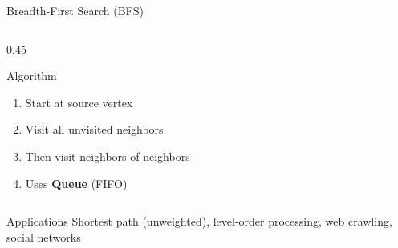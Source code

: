 \documentclass[aspectratio=169,xcolor=dvipsnames]{beamer}
\begin{document}
\begin{frame}{Breadth-First Search (BFS)}
  \begin{columns}
    \begin{column}{0.45\textwidth}
      \begin{block}{Algorithm}
        \begin{enumerate}
          \item Start at source vertex
          \item Visit all unvisited neighbors
          \item Then visit neighbors of neighbors
          \item Uses \textbf{Queue} (FIFO)
        \end{enumerate}
      \end{block}
      \begin{center}
      \end{center}
    \end{column}



  \end{columns}

  \begin{exampleblock}{Applications}
    Shortest path (unweighted), level-order processing, web crawling, social networks
  \end{exampleblock}
\end{frame}
\end{document}
